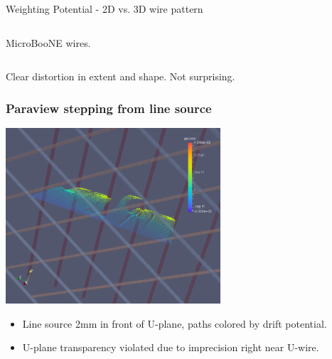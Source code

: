 \documentclass[xcolor=dvipsnames]{beamer}
\newcommand{\microboone}{MicroBooNE\xspace}
\begin{document}
\begin{frame}{Weighting Potential - 2D vs. 3D wire pattern}
\begin{columns}
\begin{column}{0.5\textwidth}
\begin{center}
        \scriptsize \microboone wires.
      \end{center}
    \end{column}
  \end{columns}

  \begin{center}
    Clear distortion in extent and shape.  Not surprising.
  \end{center}

\end{frame}


\begin{frame}
  \frametitle{Paraview stepping from line source}
  \begin{center}
    \includegraphics[width=0.6\textwidth]{track-drift-2.png}
  \end{center}

  \begin{itemize}\footnotesize
  \item Line source 2mm in front of U-plane,  paths colored by drift potential.
  \item U-plane transparency violated due to imprecision right near U-wire.
  \end{itemize}

\end{frame}
\end{document}
